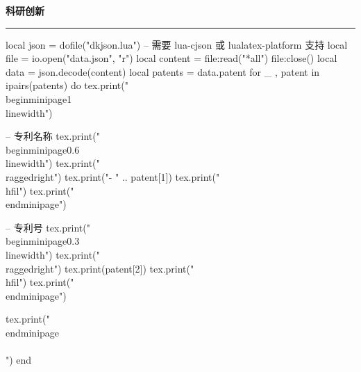 \documentclass[10pt, a4paper, oneside]{ctexart}
\begin{document}
\ifdefined\patent
\begin{minipage}{1\textwidth}
    \large{\ifdefined\showIcon \makebox[\iconAlignWide][c]{\faLightbulb} \fi \textbf{科研创新}}
\end{minipage}
\rule{\linewidth}{\lineSize}
\begin{center}
    \begin{minipage}{0.9\textwidth}
        \begin{luacode}
             local json = dofile("dkjson.lua")  -- 需要 lua-cjson 或 lualatex-platform 支持
            local file = io.open("data.json", "r")
            local content = file:read("*all")
            file:close()
            local data = json.decode(content)
            local patents = data.patent
            for _ , patent in ipairs(patents) do
                tex.print("\\begin{minipage}{1\\linewidth}")

                -- 专利名称
                tex.print("\\begin{minipage}{0.6\\linewidth}")
                tex.print("\\raggedright")
                tex.print("- " .. patent[1])
                tex.print("\\hfil")
                tex.print("\\end{minipage}")

                -- 专利号
                tex.print("\\begin{minipage}{0.3\\linewidth}")
                tex.print("\\raggedright")
                tex.print(patent[2])
                tex.print("\\hfil")
                tex.print("\\end{minipage}")

                tex.print("\\end{minipage}\\\\[0.5em]")
            end
        \end{luacode}
    \end{minipage}
\end{center}
\fi
\end{document}
